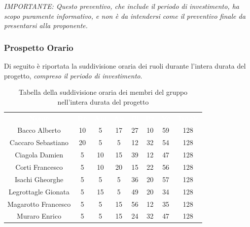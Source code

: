 \emph{IMPORTANTE: Questo preventivo, che include il periodo di investimento, ha scopo puramente informativo, e non è da intendersi come il preventivo finale da presentarsi alla proponente.}
\subsubsection{Prospetto Orario}
Di seguito è riportata la suddivisione oraria dei ruoli durante l'intera durata del progetto, \emph{compreso il periodo di investimento}.




\begin{table}[H]	
	\begin{center}
	    \begin{tabular}{cccccccc}
			\rowcolor{greySWEight}
			\textcolor{white}{\textbf{Nome}} & \textcolor{white}{\textbf{Re}} & \textcolor{white}{\textbf{Am}} & \textcolor{white}{\textbf{An}} & \textcolor{white}{\textbf{Pj}} & \textcolor{white}{\textbf{Pr}} & \textcolor{white}{\textbf{Ve}} & \textcolor{white}{\textbf{Totale}}
			\\
			Bacco Alberto & 10 & 5 & 17 & 27 & 10 & 59 & 128 \\
			Caccaro Sebastiano & 20 & 5 & 5 & 12 & 32 & 54 & 128 \\
			Ciagola Damien & 5 & 10 & 15 & 39 & 12 & 47 & 128 \\
			Corti Francesco & 5 & 10 & 20 & 15 & 22 & 56 & 128 \\
			Isachi Gheorghe & 5 & 5 & 5 & 36 & 20 & 57 & 128 \\
			Legrottagle Gionata & 5 & 15 & 5 & 49 & 20 & 34 & 128 \\
			Magarotto Francesco & 5 & 5 & 15 & 56 & 12 & 35 & 128 \\
			Muraro Enrico & 5 & 5 & 15 & 24 & 32 & 47 & 128 \\
			\end{tabular}
	    \caption{Tabella della suddivisione oraria dei membri del gruppo nell'intera durata del progetto} \label{tab:tabellaProgInt} 
	\end{center}
\end{table}

